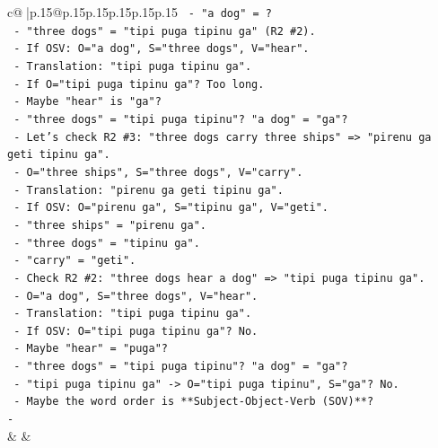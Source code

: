 \documentclass{article}
\begin{document}
{\begin{supertabular}{c@{$\;$}|p{.15\linewidth}@{}p{.15\linewidth}p{.15\linewidth}p{.15\linewidth}p{.15\linewidth}p{.15\linewidth}}
{{{\texttt{                          {-} "a dog" = ?} \\
\texttt{                          {-} "three dogs" = "tipi puga tipinu ga" (R2 \#2).} \\
\texttt{                            {-} If OSV: O="a dog", S="three dogs", V="hear".} \\
\texttt{                            {-} Translation: "tipi puga tipinu ga".} \\
\texttt{                            {-} If O="tipi puga tipinu ga"? Too long.} \\
\texttt{                            {-} Maybe "hear" is "ga"?} \\
\texttt{                            {-} "three dogs" = "tipi puga tipinu"? "a dog" = "ga"?} \\
\texttt{                            {-} Let's check R2 \#3: "three dogs carry three ships" => "pirenu ga geti tipinu ga".} \\
\texttt{                              {-} O="three ships", S="three dogs", V="carry".} \\
\texttt{                              {-} Translation: "pirenu ga geti tipinu ga".} \\
\texttt{                              {-} If OSV: O="pirenu ga", S="tipinu ga", V="geti".} \\
\texttt{                              {-} "three ships" = "pirenu ga".} \\
\texttt{                              {-} "three dogs" = "tipinu ga".} \\
\texttt{                              {-} "carry" = "geti".} \\
\texttt{                              {-} Check R2 \#2: "three dogs hear a dog" => "tipi puga tipinu ga".} \\
\texttt{                                {-} O="a dog", S="three dogs", V="hear".} \\
\texttt{                                {-} Translation: "tipi puga tipinu ga".} \\
\texttt{                                {-} If OSV: O="tipi puga tipinu ga"? No.} \\
\texttt{                                {-} Maybe "hear" = "puga"?} \\
\texttt{                                {-} "three dogs" = "tipi puga tipinu"? "a dog" = "ga"?} \\
\texttt{                                {-} "tipi puga tipinu ga" {-}> O="tipi puga tipinu", S="ga"? No.} \\
\texttt{                                {-} Maybe the word order is **Subject{-}Object{-}Verb (SOV)**?} \\
\texttt{                                  {-}} \\
            }
        }
    }
    & & \\ \\


\end{supertabular}}
\end{document}
